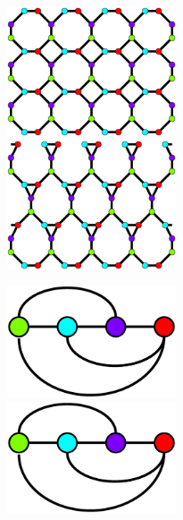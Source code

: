 \documentclass{beamer}
\begin{document}
\begin{frame}
  \begin{minipage}{2in}
     \begin{center}
         \includegraphics[height=1.5in]{periodic1a}\\
         \includegraphics[height=1.5in]{periodic1c}\\
     \end{center}
  \end{minipage}
  \begin{minipage}{1.8in}
     \begin{center}
       \includegraphics[height=1.3in]{periodic1b}\\
       \includegraphics[height=1.3in]{periodic1b}\\
     \end{center}
  \end{minipage}
\end{frame}
\end{document}
